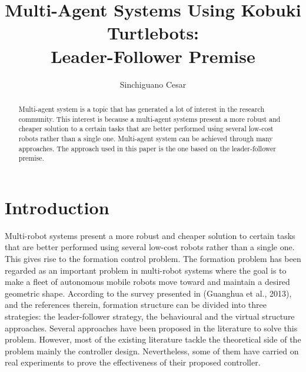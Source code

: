 \documentclass[journal]{IEEEtran}
\begin{document}
%
\title{Multi-Agent Systems Using Kobuki Turtlebots:\\Leader-Follower Premise}
\author{Sinchiguano Cesar}


\maketitle

\begin{abstract}

Multi-agent system is a topic that has generated a lot of interest in the research community. This interest is because a multi-agent systems present a more robust and cheaper solution to a certain tasks that are better performed using several low-cost robots rather than a single one. Multi-agent system can be achieved through many approaches. The approach used in this paper is the one based on the leader-follower premise.
\end{abstract}


\section{Introduction}


Multi-robot systems present a more robust and cheaper solution to certain tasks that are better performed using several low-cost robots rather than a single one. This gives rise to the formation control problem. The formation problem has been regarded as an important problem in multi-robot systems where the goal is to make a fleet of autonomous mobile robots move toward and maintain a desired geometric shape. According to the survey presented in (Guanghua et al., 2013)\cite{temp1}, and the references therein, formation structure can be divided into three strategies: the leader-follower strategy, the behavioural and the virtual structure approaches. Several approaches have been proposed in the literature to solve this problem. However, most of the existing literature tackle the theoretical side of the problem mainly the controller design. Nevertheless, some of them have carried on real experiments to prove the effectiveness of their proposed controller. 
\end{document}
